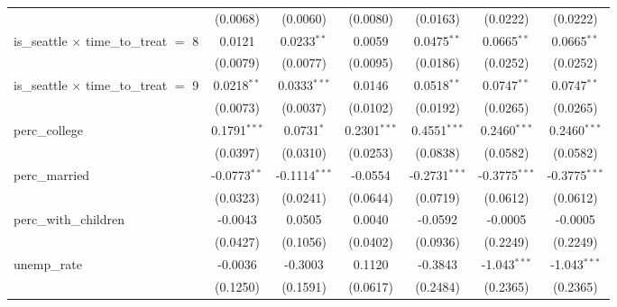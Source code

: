 \documentclass{article}
\begin{document}
\begin{appendices}
\begin{table}[ht]
{\begin{tabular}{lcccccc}
                                                   & (0.0068)       & (0.0060)        & (0.0080)              & (0.0163)        & (0.0222)        & (0.0222)\\   
   is\_seattle $\times$ time\_to\_treat $=$ 8      & 0.0121         & 0.0233$^{**}$   & 0.0059                & 0.0475$^{**}$   & 0.0665$^{**}$   & 0.0665$^{**}$\\   
                                                   & (0.0079)       & (0.0077)        & (0.0095)              & (0.0186)        & (0.0252)        & (0.0252)\\   
   is\_seattle $\times$ time\_to\_treat $=$ 9      & 0.0218$^{**}$  & 0.0333$^{***}$  & 0.0146                & 0.0518$^{**}$   & 0.0747$^{**}$   & 0.0747$^{**}$\\   
                                                   & (0.0073)       & (0.0037)        & (0.0102)              & (0.0192)        & (0.0265)        & (0.0265)\\   
   perc\_college                                   & 0.1791$^{***}$ & 0.0731$^{*}$    & 0.2301$^{***}$        & 0.4551$^{***}$  & 0.2460$^{***}$  & 0.2460$^{***}$\\   
                                                   & (0.0397)       & (0.0310)        & (0.0253)              & (0.0838)        & (0.0582)        & (0.0582)\\   
   perc\_married                                   & -0.0773$^{**}$ & -0.1114$^{***}$ & -0.0554               & -0.2731$^{***}$ & -0.3775$^{***}$ & -0.3775$^{***}$\\   
                                                   & (0.0323)       & (0.0241)        & (0.0644)              & (0.0719)        & (0.0612)        & (0.0612)\\   
   perc\_with\_children                            & -0.0043        & 0.0505          & 0.0040                & -0.0592         & -0.0005         & -0.0005\\   
                                                   & (0.0427)       & (0.1056)        & (0.0402)              & (0.0936)        & (0.2249)        & (0.2249)\\   
   unemp\_rate                                     & -0.0036        & -0.3003         & 0.1120                & -0.3843         & -1.043$^{***}$  & -1.043$^{***}$\\   
                                                   & (0.1250)       & (0.1591)        & (0.0617)              & (0.2484)        & (0.2365)        & (0.2365)\\   

\end{tabular}}
\end{table}
\end{appendices}
\end{document}
